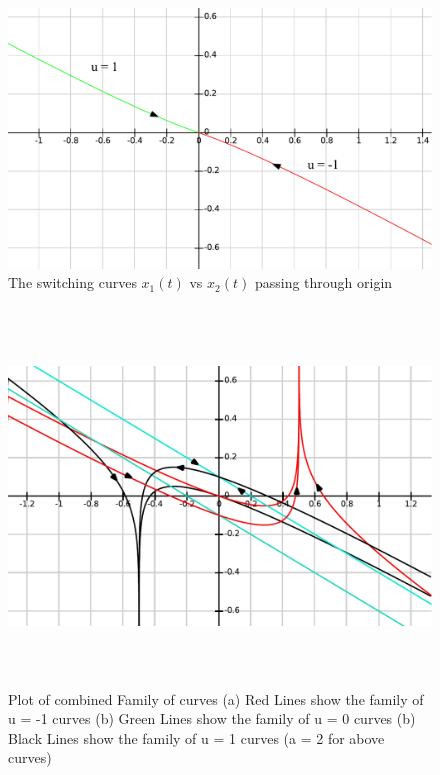 \begin{enumerate}
    \begin{figure}[h!]
      \includegraphics[width=\linewidth]{pic2.pdf}
      \caption{The switching curves $x_1(t)$ vs $x_2(t)$ passing through origin}
      \label{fig1} 
    \end{figure}
      \begin{figure}[h!]
      \includegraphics[width=\textwidth, height = 10cm, keepaspectratio= true]{pic1.pdf}
      \captionsetup{singlelinecheck=off}
      \caption{Plot of combined Family of curves (a) Red Lines show the family of u = -1 curves (b) Green Lines show the family of
u = 0 curves (b) Black Lines show the family of u = 1 curves (a = 2 for above curves)}
      \label{fig2} 
    \end{figure}
     \begin{figure}[h!]

\end{figure}
\end{enumerate}
